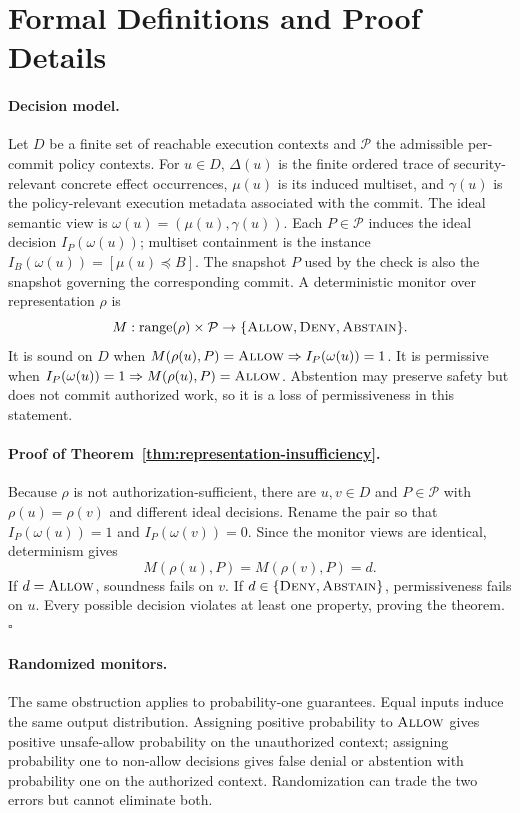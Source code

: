 \section{Formal Definitions and Proof Details}
\label{app:formal-proofs}

\paragraph{Decision model.}
Let $D$ be a finite set of reachable execution contexts and $\mathcal{P}$ the
admissible per-commit policy contexts.  For $u\in D$, $\Delta(u)$ is
the finite ordered trace of security-relevant concrete effect occurrences,
$\mu(u)$ is its induced multiset, and $\gamma(u)$ is the policy-relevant
execution metadata associated with the commit.  The ideal semantic view is
$\omega(u)=(\mu(u),\gamma(u))$.  Each $P\in\mathcal P$ induces the ideal
decision $I_P(\omega(u))$; multiset containment is the instance
$I_B(\omega(u))=[\mu(u)\preceq B]$.  The snapshot $P$ used by the check is also the
snapshot governing the corresponding commit.  A deterministic monitor over
representation
$\rho$ is
\[
  M:\mathrm{range}(\rho)\times\mathcal P
  \rightarrow\{\textnormal{\textsc{Allow}},\textnormal{\textsc{Deny}},\textnormal{\textsc{Abstain}}\}.
\]
It is sound on $D$ when $M(\rho(u),P)=\textnormal{\textsc{Allow}}\Rightarrow I_P(\omega(u))=1$.
It is permissive when $I_P(\omega(u))=1\Rightarrow
M(\rho(u),P)=\textnormal{\textsc{Allow}}$.  Abstention may
preserve safety but does not commit authorized work, so it is a loss of
permissiveness in this statement.

\paragraph{Proof of Theorem~\ref{thm:representation-insufficiency}.}
Because $\rho$ is not authorization-sufficient, there are $u,v\in D$ and
$P\in\mathcal P$ with $\rho(u)=\rho(v)$ and different ideal decisions. Rename
the pair so that $I_P(\omega(u))=1$ and $I_P(\omega(v))=0$. Since the monitor views are
identical, determinism gives
\[
 M(\rho(u),P)=M(\rho(v),P)=d.
\]
If $d=\textnormal{\textsc{Allow}}$, soundness fails on $v$. If $d\in\{\textnormal{\textsc{Deny}},\textnormal{\textsc{Abstain}}\}$,
permissiveness fails on $u$. Every possible decision violates at least one
property, proving the theorem. \hfill$\square$

\paragraph{Randomized monitors.}
The same obstruction applies to probability-one guarantees. Equal inputs
induce the same output distribution. Assigning positive probability to
$\textnormal{\textsc{Allow}}$ gives positive unsafe-allow probability on the unauthorized context;
assigning probability one to non-allow decisions gives false denial or
abstention with probability one on the authorized context. Randomization can
trade the two errors but cannot eliminate both.

